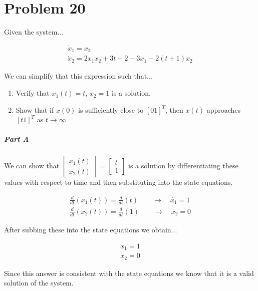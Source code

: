 \section*{Problem 20}
Given the system...

$$
\begin{array}{l}
\dot{x}_{1}=x_{2} \\
\dot{x}_{2}=2 x_{1} x_{2}+3 t+2-3 x_{1}-2(t+1) x_{2}
\end{array}
$$

\noindent We can simplify that this expression such that...



\begin{enumerate}
  \begin{enumerate}
    \item Verify that $x_1(t) = t$, $x_2 = 1$ is a solution.
    \item Show that if $x(0)$ is sufficiently close to $[0 1]^T$, then $x(t)$ approaches $[t 1]^T$ as $t\rightarrow \infty$
  \end{enumerate}
\end{enumerate}

\subparagraph*{Part A}

We can show that $\begin{bmatrix} x_1(t) \\ x_2(t)  \end{bmatrix} = \begin{bmatrix}   t \\ 1 \end{bmatrix}$ is a solution by differentiating these values with respect to time and then substituting into the state equations.

$$
\begin{array}{l}
  \frac{d}{dt} \left( x_1(t) \right) = \frac{d}{dt} \left( t \right) \quad \quad \rightarrow \quad \dot{x_1} = 1 \\
  \frac{d}{dt} \left( x_2(t) \right) = \frac{d}{dt} \left( 1 \right) \quad \quad \rightarrow  \quad \dot{x_2} = 0
\end{array}
$$

\noindent After subbing these into the state equations we obtain...

$$
\begin{array}{l}
  \dot{x}_{1}=1 \\
  \dot{x}_{2}=0
\end{array}
$$


\noindent Since this answer is consistent with the state equations we know that it is a valid solution of the system.


